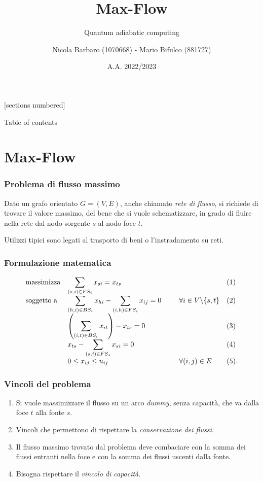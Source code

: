 \documentclass[10pt]{beamer}
\title{Max-Flow}
\subtitle{Quantum adiabatic computing}
\date{A.A. 2022/2023}
\author{Nicola Barbaro (1070668) - Mario Bifulco (881727)}
\institute{Università degli studi di Torino - Ottimizzazione Combinatoria}
\begin{document}
\maketitle

[sections numbered]

\begin{frame}{Table of contents}
  \tableofcontents
\end{frame}

\section{Max-Flow}
\begin{frame}
  \frametitle{Problema di flusso massimo}

  Dato un grafo orientato $G = (V, E)$, anche chiamato \emph{rete di flusso}, 
  si richiede di trovare il valore massimo, del bene che si vuole schematizzare, 
  in grado di fluire nella rete dal nodo sorgente $s$ al nodo foce $t$. 

  Utilizzi tipici sono legati al trasporto di beni o l'instradamento su reti.

\end{frame}
\begin{frame}
  \frametitle{Formulazione matematica}

  \begin{equation*}
    \begin{array}{ll@{}ll}
      \text{massimizza}   & \displaystyle\sum_{(s, i) \in FS_{i}} x_{si} = x_{ts} & \;\;\;\;\;\;\;\;\; &(1)\\
      \text{soggetto a}   & \displaystyle\sum_{(h, i) \in BS_{i}} x_{hi} - \sum_{(i, h) \in FS_{i}} x_{ij} = 0 \;\;\;\;\;\;\;\;\; &    \forall i \in V \backslash \{s,t\}&(2)\\
                          & \left(\displaystyle\sum_{(i, t) \in BS_{t}} x_{it}\right) - x_{ts} = 0 & &(3)\\
                          &  x_{ts} - \displaystyle\sum_{(s,i) \in FS_{s}} x_{si} = 0 & &(4)\\
                          &0 \leq x_{ij} \leq u_{ij} & \forall (i,j) \in E &(5).
    \end{array}
  \end{equation*}

\end{frame}
\begin{frame}
  \frametitle{Vincoli del problema}

  \begin{enumerate}
    \item Si vuole massimizzare il flusso su un arco \emph{dummy}, senza capacità, che va dalla foce $t$ alla fonte $s$.
    \item Vincoli che permettono di rispettare la \emph{conservazione dei flussi}.
    \item Il flusso massimo trovato dal problema deve combaciare con la somma dei flussi entranti nella foce e con la somma dei flussi uscenti dalla fonte.
    \item Bisogna rispettare il \emph{vincolo di capacità}.
\end{enumerate}

\end{frame}
\end{document}
